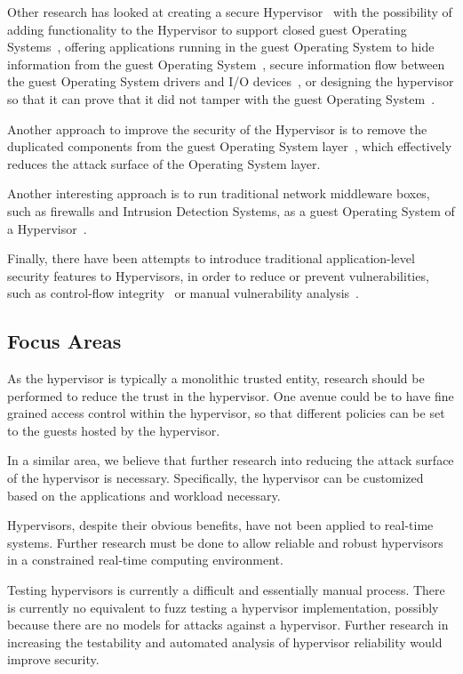 \documentclass[11pt,letterpaper]{article}
\begin{document}
Other research has looked at creating a secure
Hypervisor~\cite{Robin2000, Belay2012, Szefer2011, Vasudevan2013} with
the possibility of adding functionality to the Hypervisor to support
closed guest Operating Systems~\cite{Garfinkel2003}, offering
applications running in the guest Operating System to hide information
from the guest Operating System~\cite{Chen2008, Yang2008, Jin2011,
  Szefer2012, Azab2011, Zhang2011, Jin2011a, Szefer2011a}, secure
information flow between the guest Operating System drivers and I/O
devices~\cite{Cheng2013}, or designing the hypervisor so that it can
prove that it did not tamper with the guest Operating
System~\cite{Gu2011}.

Another approach to improve the security of the Hypervisor is to
remove the duplicated components from the guest Operating System
layer~\cite{Kivity2014, Madhavapeddy2015}, which effectively reduces
the attack surface of the Operating System layer.

Another interesting approach is to run traditional network middleware
boxes, such as firewalls and Intrusion Detection Systems, as a guest
Operating System of a Hypervisor~\cite{Martins2014}.

Finally, there have been attempts to introduce traditional
application-level security features to Hypervisors, in order to reduce
or prevent vulnerabilities, such as control-flow
integrity~\cite{Wang2010} or manual vulnerability
analysis~\cite{Perez-Botero2013}.

\subsection{Focus Areas}

As the hypervisor is typically a monolithic trusted entity, research
should be performed to reduce the trust in the hypervisor. One avenue
could be to have fine grained access control within the hypervisor, so
that different policies can be set to the guests hosted by the
hypervisor.

In a similar area, we believe that further research into reducing the
attack surface of the hypervisor is necessary. Specifically, the
hypervisor can be customized based on the applications and workload
necessary. 

Hypervisors, despite their obvious benefits, have not been applied to
real-time systems. Further research must be done to allow reliable and
robust hypervisors in a constrained real-time computing environment.

Testing hypervisors is currently a difficult and essentially manual
process. There is currently no equivalent to fuzz testing a hypervisor
implementation, possibly because there are no models for attacks
against a hypervisor. Further research in increasing the testability
and automated analysis of hypervisor reliability would improve security.
\end{document}
